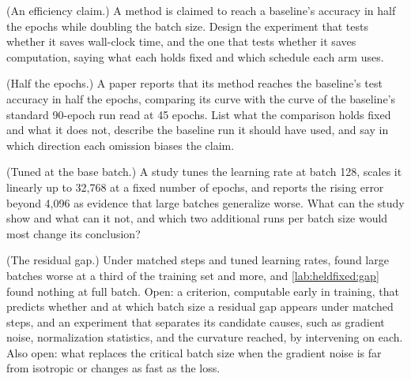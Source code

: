 \begin{refsection}
\begin{exercises}
\item \design (An efficiency claim.) A method is claimed to reach a baseline's accuracy in half the epochs while doubling the batch size. Design the experiment that tests whether it saves wall-clock time, and the one that tests whether it saves computation, saying what each holds fixed and which schedule each arm uses.\label{ex:heldfixed:efficiency}

\item \critique (Half the epochs.) A paper reports that its method reaches the baseline's test accuracy in half the epochs, comparing its curve with the curve of the baseline's standard 90-epoch run read at 45 epochs. List what the comparison holds fixed and what it does not, describe the baseline run it should have used, and say in which direction each omission biases the claim.\label{ex:heldfixed:critique1}

\item \critique (Tuned at the base batch.) A study tunes the learning rate at batch 128, scales it linearly up to 32,768 at a fixed number of epochs, and reports the rising error beyond 4,096 as evidence that large batches generalize worse. What can the study show and what can it not, and which two additional runs per batch size would most change its conclusion?\label{ex:heldfixed:critique2}

\item \research (The residual gap.) Under matched steps and tuned learning rates, \textcite{SmithElsenDe2020} found large batches worse at a third of the training set and more, and \cref{lab:heldfixed:gap} found nothing at full batch. Open: a criterion, computable early in training, that predicts whether and at which batch size a residual gap appears under matched steps, and an experiment that separates its candidate causes, such as gradient noise, normalization statistics, and the curvature reached, by intervening on each. Also open: what replaces the critical batch size when the gradient noise is far from isotropic or changes as fast as the loss.\label{ex:heldfixed:research}
\end{exercises}


\end{refsection}
